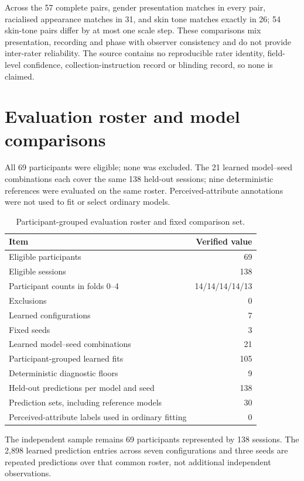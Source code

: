 Across the 57 complete pairs, gender presentation matches in every pair, racialised appearance
matches in 31, and skin tone matches exactly in 26; 54 skin-tone pairs differ by at most one scale
step. These comparisons mix presentation, recording and phase with observer consistency and do
not provide inter-rater reliability. The source contains no reproducible rater identity,
field-level confidence, collection-instruction record or blinding record, so none is claimed.

\section{Evaluation roster and model comparisons}

All 69 participants were eligible; none was excluded. The 21 learned model--seed
combinations each cover the same 138 held-out sessions; nine deterministic references were evaluated on
the same roster. Perceived-attribute annotations were not used to fit or select ordinary models.

\begin{table}[htbp]
\centering
\caption{Participant-grouped evaluation roster and fixed comparison set.}
\label{tab:stage-a-release}
\begin{tabular}{lr}
\toprule
Item & Verified value \\
\midrule
Eligible participants & 69 \\
Eligible sessions & 138 \\
Participant counts in folds 0--4 & 14/14/14/14/13 \\
Exclusions & 0 \\
Learned configurations & 7 \\
Fixed seeds & 3 \\
Learned model--seed combinations & 21 \\
Participant-grouped learned fits & 105 \\
Deterministic diagnostic floors & 9 \\
Held-out predictions per model and seed & 138 \\
Prediction sets, including reference models & 30 \\
Perceived-attribute labels used in ordinary fitting & 0 \\
\bottomrule
\end{tabular}
\end{table}
\FloatBarrier

The independent sample remains 69 participants represented by 138 sessions. The 2,898 learned
prediction entries across seven configurations and three seeds are repeated predictions over that
common roster, not additional independent observations.

